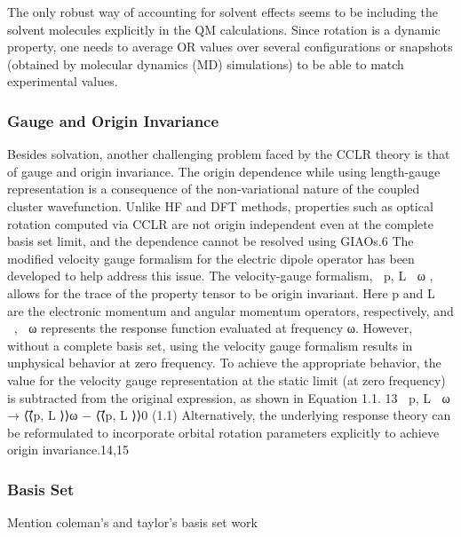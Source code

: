 
The only robust way of accounting for solvent effects seems to be including the solvent molecules explicitly 
in the QM calculations. Since rotation is a dynamic property, one needs to average OR values over several 
configurations or snapshots (obtained by molecular dynamics (MD) simulations) to be able to match experimental 
values. 

\subsubsection{Gauge and Origin Invariance}
Besides solvation, another challenging problem faced by the CCLR theory is that of 
gauge and origin invariance.
The origin dependence while using length-gauge representation is a consequence of the non-variational nature of the 
coupled cluster wavefunction. Unlike HF and DFT methods, properties such as optical rotation computed via CCLR 
are not origin independent even at the complete basis set limit, and the dependence cannot be resolved using GIAOs.6 
The modified velocity gauge formalism for the electric dipole operator has been developed to help address this 
issue. The velocity-gauge formalism, ⟨⟨⃗p, L⃗ ⟩⟩ω , allows for the trace of the property tensor to be origin 
invariant. Here ⃗p and L⃗ are the electronic momentum and angular momentum operators, respectively, and 
⟨⟨, ⟩⟩ω represents the response function evaluated at frequency ω. However, without a complete basis
set, using the velocity gauge formalism results in unphysical behavior at zero frequency. To achieve the 
appropriate behavior, the value for the velocity gauge representation at the static limit (at zero frequency) 
is subtracted from the original expression, as shown in Equation 1.1. 13
⟨⟨⃗p, L⃗ ⟩⟩ω → ⟨⟨⃗p, L⃗ ⟩⟩ω − ⟨⟨⃗p, L⃗ ⟩⟩0 (1.1) Alternatively, the underlying response theory can be reformulated to incorporate 
orbital rotation parameters explicitly to achieve origin invariance.14,15
\subsubsection{Basis Set}
Mention coleman's and taylor's basis set work 
